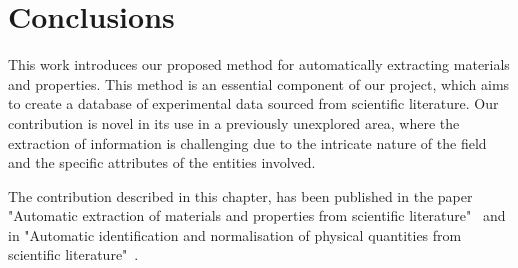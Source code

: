 \section{Conclusions}

This work introduces our proposed method for automatically extracting materials and properties. This method is an essential component of our project, which aims to create a database of experimental data sourced from scientific literature.
Our contribution is novel in its use in a previously unexplored area, where the extraction of information is challenging due to the intricate nature of the field and the specific attributes of the entities involved. 

The contribution described in this chapter, has been published in the paper "Automatic extraction of materials and properties from scientific literature"~\cite{foppiano2023automatic} and in "Automatic identification and normalisation of physical quantities from scientific literature"~\cite{foppiano2019quantities}.
